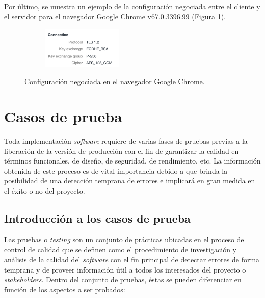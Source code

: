 \documentclass[12pt,a4paper, twoside]{report}
\begin{document}
	Por último, se muestra un ejemplo de la configuración negociada entre el cliente y el servidor para el navegador Google Chrome v67.0.3396.99 (Figura \ref{fig:handshake}). \\ 
		
	\begin{figure}[!ht]   
		\caption{Configuración negociada en el navegador Google Chrome.} 
		\begin{center} 
			\includegraphics[width=6cm,height=2cm]{Images/implement/handshake} \\
			\label{fig:handshake} 
		\end{center}  
	\end{figure}	

	\chapter{Casos de prueba} \label{testingChapter}
	
	Toda implementación \textit{software} requiere de varias fases de pruebas previas a la liberación de la versión de producción con el fin de garantizar la calidad en términos funcionales, de diseño, de seguridad, de rendimiento, etc. La información obtenida de este proceso es de vital importancia debido a que brinda la posibilidad de una detección temprana de errores e implicará en gran medida en el éxito o no del proyecto.
	
	\section{Introducción a los casos de prueba}
	
	Las pruebas o \textit{testing} son un conjunto de prácticas ubicadas en el proceso de control de calidad que se definen como el procedimiento de investigación y análisis de la calidad del \textit{software} con el fin principal de detectar errores de forma temprana y de proveer información útil a todos los interesados del proyecto o \textit{\glspl{stakeholder}}. Dentro del conjunto de pruebas, éstas se pueden diferenciar en función de los aspectos a ser probados:
	
\end{document}
